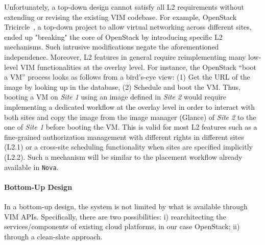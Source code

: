 Unfortunately, a top-down design cannot satisfy all L2 requirements
without extending or revising the existing VIM codebase. For example,
OpenStack Tricircle~\cite{tricircle}, a top-down project to allow
virtual networking across different sites, ended up "breaking" the
core of OpenStack by introducing specific L2 mechanisms. Such
intrusive modifications negate the aforementioned independence.
%
Moreover, L2 features in general require reimplementing 
many low-level VIM functionalities at the overlay level. For
instance, the OpenStack ``boot a VM'' process looks as follows from a
bird's-eye view: (1) Get the URL of the image by looking up in the
database, (2) Schedule and boot the VM. Thus, booting a VM on
\emph{Site 1} using an image defined in \emph{Site 2} would require
implementing a dedicated workflow at the overlay level in order to
interact with both sites and copy the image from the image manager
(\ie Glance) of \emph{Site 2} to the one of \emph{Site 1} before booting the VM. 
%
This is valid for most L2 features such as a fine-grained
authorization management with different rights in different \edge
sites (L2.1) or a cross-site scheduling functionality when sites are
specified implicitly (L2.2). Such a mechanism will be similar to the
placement workflow already available in \texttt{Nova}.

%





\paragraph{Bottom-Up Design}
In a bottom-up design, the system is not limited by what is available through VIM APIs. 
Specifically, there are two possibilities: i) rearchitecting  the services/components of existing cloud platforms, in our case OpenStack; ii) through a clean-slate approach.

